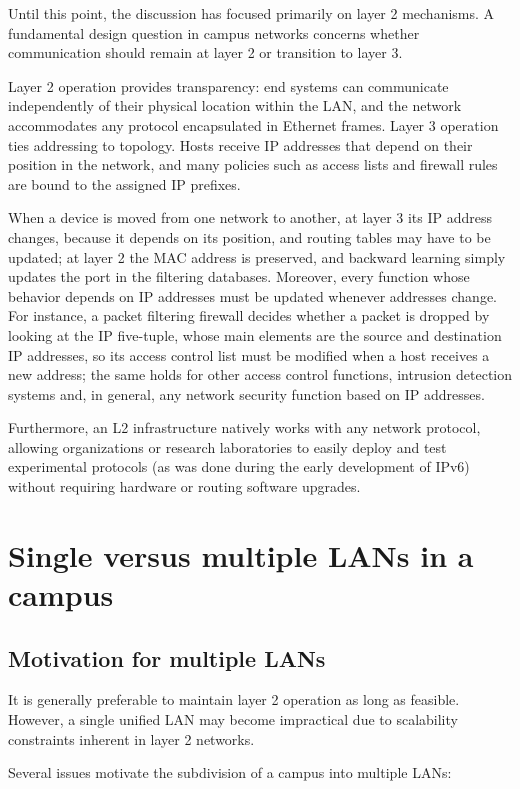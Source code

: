 Until this point, the discussion has focused primarily on layer 2 mechanisms. A fundamental design question in campus networks concerns whether communication should remain at layer 2 or transition to layer 3.

Layer 2 operation provides transparency: end systems can communicate independently of their physical location within the LAN, and the network accommodates any protocol encapsulated in Ethernet frames. Layer 3 operation ties addressing to topology. Hosts receive IP addresses that depend on their position in the network, and many policies such as access lists and firewall rules are bound to the assigned IP prefixes.

When a device is moved from one network to another, at layer 3 its IP address changes, because it depends on its position, and routing tables may have to be updated; at layer 2 the MAC address is preserved, and backward learning simply updates the port in the filtering databases. Moreover, every function whose behavior depends on IP addresses must be updated whenever addresses change. For instance, a packet filtering firewall decides whether a packet is dropped by looking at the IP five-tuple, whose main elements are the source and destination IP addresses, so its access control list must be modified when a host receives a new address; the same holds for other access control functions, intrusion detection systems and, in general, any network security function based on IP addresses.


Furthermore, an L2 infrastructure natively works with any network protocol, allowing organizations or research laboratories to easily deploy and test experimental protocols (as was done during the early development of IPv6) without requiring hardware or routing software upgrades.

\section{Single versus multiple LANs in a campus}

\subsection{Motivation for multiple LANs}

It is generally preferable to maintain layer 2 operation as long as feasible. However, a single unified LAN may become impractical due to scalability constraints inherent in layer 2 networks.

Several issues motivate the subdivision of a campus into multiple LANs:

